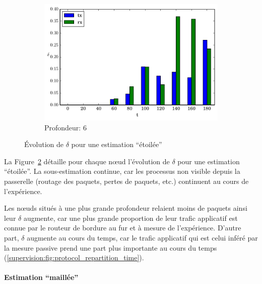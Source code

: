 \begin{figure}[h]
\begin{subfigure}{0.3\textwidth}
    \includegraphics[width=\textwidth]{img/evolution_noinfo_6.pdf}
    \caption{Profondeur: 6}
    \label{supervision:fig:noinfo_6}
  \end{subfigure}
  \caption{Évolution de $\delta$ pour une estimation ``étoilée''}
  \label{supervision:fig:noinfo}
\end{figure}

La Figure~\ref{supervision:fig:noinfo} détaille pour chaque nœud l'évolution de $\delta$ pour une estimation ``étoilée''.
La sous-estimation continue, car les processus non visible depuis la passerelle (routage des paquets, pertes de paquets, etc.) continuent au cours de l'expérience.

Les nœuds situés à une plus grande profondeur relaient moins de paquets ainsi leur $\delta$ augmente, car une plus grande proportion de leur trafic applicatif est connue par le routeur de bordure au fur et à mesure de l'expérience.
D'autre part, $\delta$ augmente au cours du temps, car le trafic applicatif qui est celui inféré par la mesure passive prend une part plus importante au cours du temps (\ref{supervision:fig:protocol_repartition_time}).

\paragraph{Estimation ``maillée''}

